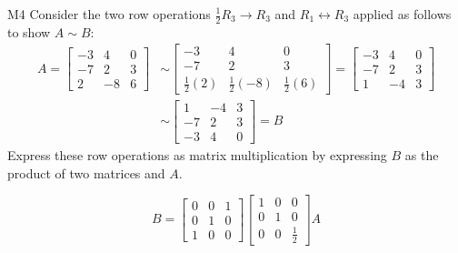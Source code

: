 \begin{problem}{M4}
Consider the two row operations 
\(\frac{1}{2} R_3\to R_3\) and \(R_1\leftrightarrow R_3\)
applied as follows to show \(A\sim B\):
\begin{align*}
A
  =
\begin{bmatrix}
-3&4&0\\
-7&2&3\\
2&-8&6
\end{bmatrix}
  &\sim
\begin{bmatrix}
-3&4&0\\
-7&2&3\\
\frac{1}{2}(2)&\frac{1}{2}(-8)&\frac{1}{2}(6)
\end{bmatrix}
  =
\begin{bmatrix}
-3&4&0\\
-7&2&3\\
1&-4&3
\end{bmatrix}
  \\&\sim
\begin{bmatrix}
1&-4&3\\
-7&2&3\\
-3&4&0
\end{bmatrix}
  =
B
\end{align*}
Express these row operations as matrix multiplication
by expressing \(B\) as the product of two matrices and \(A\).
\end{problem}
\begin{solution}
\[
B
  =
\begin{bmatrix}
  0&0&1\\
  0&1&0\\
  1&0&0
\end{bmatrix}
\begin{bmatrix}
  1&0&0\\
  0&1&0\\
  0&0&\frac{1}{2}
\end{bmatrix}
A
\]
\end{solution}

